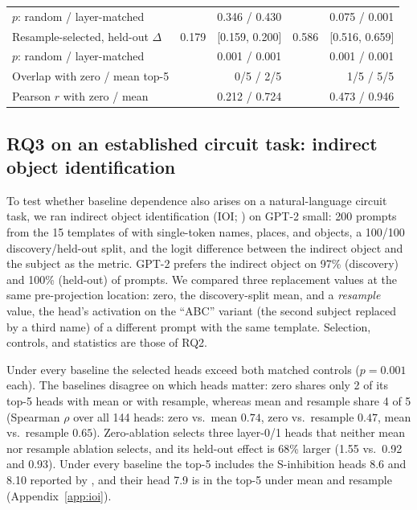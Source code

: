 \documentclass{article}
\begin{document}
\begin{table}[t]
\begin{tabular}{lrrrr}
    \quad $p$: random / layer-matched & \multicolumn{2}{r}{0.346 / 0.430} & \multicolumn{2}{r}{0.075 / 0.001} \\
    Resample-selected, held-out $\Delta$ & 0.179 & [0.159, 0.200] & 0.586 & [0.516, 0.659] \\
    \quad $p$: random / layer-matched & \multicolumn{2}{r}{0.001 / 0.001} & \multicolumn{2}{r}{0.001 / 0.001} \\
    Overlap with zero / mean top-5 & \multicolumn{2}{r}{0/5 / 2/5} & \multicolumn{2}{r}{1/5 / 5/5} \\
    Pearson $r$ with zero / mean & \multicolumn{2}{r}{0.212 / 0.724} & \multicolumn{2}{r}{0.473 / 0.946} \\
    \bottomrule
  \end{tabular}
\end{table}

\subsection{RQ3 on an established circuit task: indirect object identification}
\label{sec:ioi}

To test whether baseline dependence also arises on a natural-language
circuit task, we ran indirect object identification (IOI;
\citealp{wang2023interpretability}) on GPT-2 small: 200 prompts from the
15 templates of \citet{wang2023interpretability} with single-token
names, places, and objects, a 100/100 discovery/held-out split, and the
logit difference between the indirect object and the subject as the
metric. GPT-2 prefers the indirect object on 97\% (discovery) and 100\%
(held-out) of prompts. We compared three replacement values at the same
pre-projection location: zero, the discovery-split mean, and a
\emph{resample} value, the head's activation on the ``ABC'' variant (the
second subject replaced by a third name) of a different prompt with the
same template. Selection, controls, and statistics are those of RQ2.

Under every baseline the selected heads exceed both matched controls
($p=0.001$ each). The baselines disagree on which heads matter: zero
shares only 2 of its top-5 heads with mean or with resample, whereas
mean and resample share 4 of 5 (Spearman $\rho$ over all 144 heads:
zero vs.\ mean $0.74$, zero vs.\ resample $0.47$, mean vs.\ resample
$0.65$). Zero-ablation selects three layer-0/1 heads that neither
mean nor resample ablation selects, and its held-out effect is 68\% larger
(1.55 vs.\ 0.92 and 0.93). Under every baseline the top-5 includes the
S-inhibition heads 8.6 and 8.10 reported by
\citet{wang2023interpretability}, and their head 7.9 is in the top-5
under mean and resample (Appendix~\ref{app:ioi}).
\end{document}
